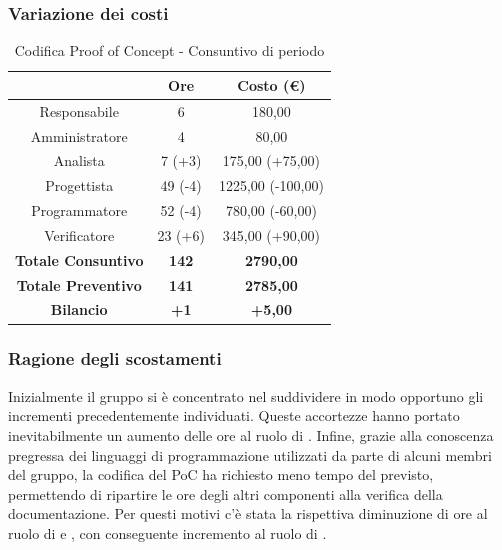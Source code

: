 \subsubsection{Variazione dei costi} \label{subsubsection:variazione_costi_Poc}

\begin{table}[H]
  \centering
  \renewcommand{\arraystretch}{1.8}
  \begin{tabular}{c|c|c}
    \rowcolor[HTML]{125E28}
    \multicolumn{1}{c}{\color[HTML]{FFFFFF}\textbf{Ruolo}} &
    \multicolumn{1}{c}{\color[HTML]{FFFFFF}\textbf{Ore}}   &
    \multicolumn{1}{c}{\color[HTML]{FFFFFF}\textbf{Costo (€)}}                                \\
    \hline
    Responsabile                                           & 6            & 180,00            \\
    Amministratore                                         & 4            & 80,00             \\
    Analista                                               & 7 (+3)       & 175,00 (+75,00)   \\
    Progettista                                            & 49 (-4)      & 1225,00 (-100,00) \\
    Programmatore                                          & 52 (-4)      & 780,00 (-60,00)   \\
    Verificatore                                           & 23 (+6)      & 345,00 (+90,00)   \\
    \textbf{Totale Consuntivo}                             & \textbf{142} & \textbf{2790,00}  \\
    \textbf{Totale Preventivo}                             & \textbf{141} & \textbf{2785,00}  \\
    \textbf{Bilancio}                                      & \textbf{+1}  & \textbf{+5,00}    \\
  \end{tabular}
  \caption{Codifica Proof of Concept - Consuntivo di periodo}
\end{table}

\pagebreak
\subsubsection{Ragione degli scostamenti} \label{subsubsection:ragione_scostamenti_PoC}
Inizialmente il gruppo si è concentrato nel suddividere in modo opportuno gli incrementi precedentemente individuati.
Queste accortezze hanno portato inevitabilmente un aumento delle ore al ruolo di \roleAnalystLow{}.
Infine, grazie alla conoscenza pregressa dei linguaggi di programmazione utilizzati da parte di alcuni membri del gruppo, la codifica del PoC\glo{} ha richiesto meno tempo del previsto, permettendo di ripartire le ore degli altri componenti alla verifica della documentazione.
Per questi motivi c'è stata la rispettiva diminuzione di ore al ruolo di \roleDesignerLow{} e \roleProgrammerLow{}, con conseguente incremento al ruolo di \roleVerifierLow{}.

